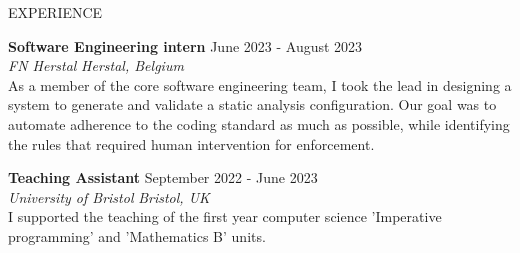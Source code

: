 \documentclass{resume} %
\begin{document}
\begin{rSection}{EXPERIENCE}

\textbf{Software Engineering intern} \hfill June 2023 - August 2023\\
\textit{FN Herstal} \hfill \textit{Herstal, Belgium} \\
As a member of the core software engineering team, I took the lead in designing a system to generate and validate a static analysis configuration. Our goal was to automate adherence to the coding standard as much as possible, while identifying the rules that required human intervention for enforcement.

\textbf{Teaching Assistant} \hfill September 2022 - June 2023\\
\textit{University of Bristol} \hfill \textit{Bristol, UK} \\
I supported the teaching of the first year computer science 'Imperative programming' and 'Mathematics B' units.
 
\end{rSection} 

\end{document}
